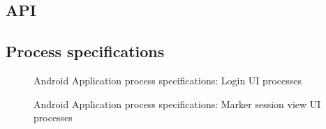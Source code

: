 \topmargin=-0.45in
\evensidemargin=0in
\oddsidemargin=0in
\textwidth=6.5in
\textheight=9.0in
\headsep=0.25in

\linespread{1.1} %
\subsection{API}

\subsection{Process specifications}
\begin{figure}[H]
\centering	
{}
\caption{Android Application process specifications: Login UI processes}
\end{figure}

\begin{figure}[H]
\centering	
{}
\caption{Android Application process specifications: Marker session view UI processes}
\end{figure}

